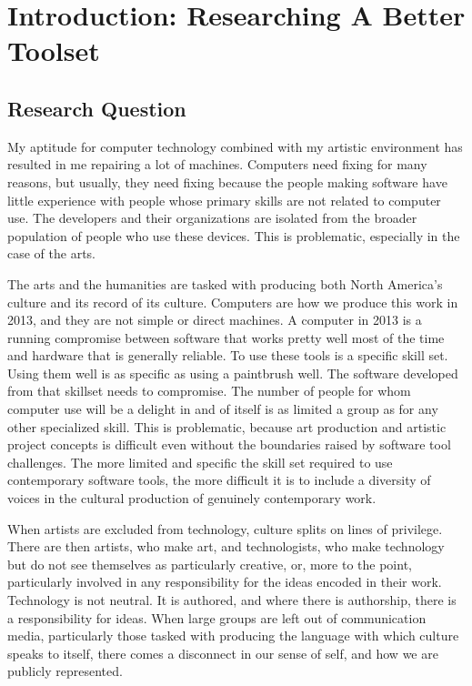 
\chapter{Introduction: Researching A Better Toolset} %

\label{Chapter1} %



\section{Research Question}
My aptitude for computer technology combined with my artistic environment has resulted in me repairing a lot of machines. Computers need fixing for many reasons, but usually, they need fixing because the people making software have little experience with people whose primary skills are not related to computer use. The developers and their organizations are isolated from the broader population of people who use these devices. This is problematic, especially in the case of the arts. 

The arts and the humanities are tasked with producing both North America’s culture and its record of its culture. Computers are how we produce this work in 2013, and they are not simple or direct machines. A computer in 2013 is a running compromise between software that works pretty well most of the time and hardware that is generally reliable. To use these tools is a specific skill set. Using them well is as specific as using a paintbrush well. The software developed from that skillset needs to compromise. The number of people for whom computer use will be a delight in and of itself is as limited a group as for any other specialized skill. This is problematic, because art production and artistic project concepts is difficult even without the boundaries raised by software tool challenges. The more limited and specific the skill set required to use contemporary software tools, the more difficult it is to include a diversity of voices in the cultural production of genuinely contemporary work. 

When artists are excluded from technology, culture splits on lines of privilege. There are then artists, who make art, and technologists, who make technology but do not see themselves as particularly creative, or, more to the point, particularly involved in any responsibility for the ideas encoded in their work. Technology is not neutral. It is authored, and where there is authorship, there is a responsibility for ideas. When large groups are left out of communication media, particularly those tasked with producing the language with which culture speaks to itself, there comes a disconnect in our sense of self, and how we are publicly represented. 

